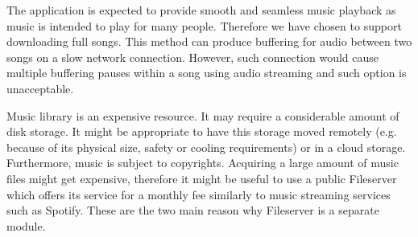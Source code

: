 \par
The application is expected to provide smooth and seamless music playback as music is intended to play for many people. Therefore we have chosen to support downloading full songs. This method can produce buffering for audio between two songs on a slow network connection. However, such connection would cause multiple buffering pauses within a song using audio streaming and such option is unacceptable.
\par
Music library is an expensive resource. It may require a considerable amount of disk storage. It might be appropriate to have this storage moved remotely (e.g. because of its physical size, safety or cooling requirements) or in a cloud storage. Furthermore, music is subject to copyrights. Acquiring a large amount of music files might get expensive, therefore it might be useful to use a public Fileserver which offers its service for a monthly fee similarly to music streaming services such as Spotify. These are the two main reason why Fileserver is a separate module.